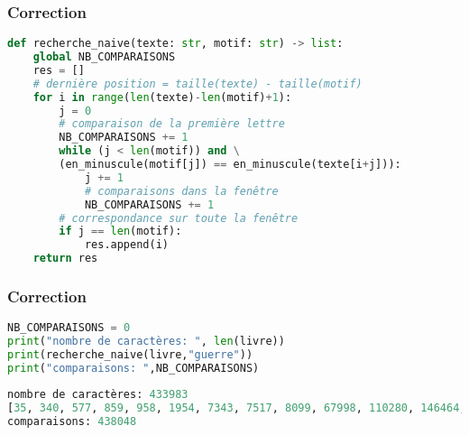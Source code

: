 \documentclass[svgnames,11pt]{beamer}
\begin{document}
\begin{frame}[fragile]
    \frametitle{Correction}

    \begin{center}
    \begin{lstlisting}[language=Python , basicstyle=\ttfamily\small, xleftmargin=0.2em, xrightmargin=-5em]
def recherche_naive(texte: str, motif: str) -> list:
    global NB_COMPARAISONS
    res = []
    # dernière position = taille(texte) - taille(motif)
    for i in range(len(texte)-len(motif)+1):
        j = 0
        # comparaison de la première lettre
        NB_COMPARAISONS += 1
        while (j < len(motif)) and \
        (en_minuscule(motif[j]) == en_minuscule(texte[i+j])):
            j += 1
            # comparaisons dans la fenêtre
            NB_COMPARAISONS += 1   
        # correspondance sur toute la fenêtre     
        if j == len(motif):  
            res.append(i)
    return res
\end{lstlisting}
    \end{center}

\end{frame}
\begin{frame}[fragile]
    \frametitle{Correction}

    \begin{center}
    \begin{lstlisting}[language=Python , basicstyle=\ttfamily\small, xleftmargin=1em, xrightmargin=1em]
NB_COMPARAISONS = 0
print("nombre de caractères: ", len(livre))
print(recherche_naive(livre,"guerre"))
print("comparaisons: ",NB_COMPARAISONS)
\end{lstlisting}
    \end{center}
\begin{center}
\begin{lstlisting}[language=Python , basicstyle=\ttfamily\small, xleftmargin=1em, xrightmargin=1em]
nombre de caractères: 433983
[35, 340, 577, 859, 958, 1954, 7343, 7517, 8099, 67998, 110280, 146464, 229890, 241073, 264650, 272295, 326198, 333691, 333738, 333770, 334412, 372834, 376022, 392191, 393202, 401899, 415041, 415120]
comparaisons: 438048
\end{lstlisting}
\label{CODE}
\end{center}
\end{frame}
\end{document}
